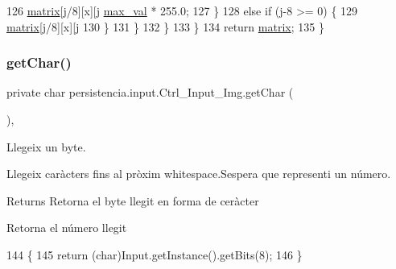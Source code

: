 \begin{DoxyCode}
126                         \hyperlink{classpersistencia_1_1input_1_1Ctrl__Input__Img_ae61f4eb4fa38ea6dfb1e03f443711948}{matrix}[j/8][x][j%
      \hyperlink{classpersistencia_1_1input_1_1Ctrl__Input__Img_a1b8fa2d000a1d5d873be62d1f609e4be}{max\_val} * 255.0;
127                     \}
128                     \textcolor{keywordflow}{else} \textcolor{keywordflow}{if} (j-8 >= 0) \{
129                         \hyperlink{classpersistencia_1_1input_1_1Ctrl__Input__Img_ae61f4eb4fa38ea6dfb1e03f443711948}{matrix}[j/8][x][j%
130                     \}
131                 \}
132             \}
133         \}
134         \textcolor{keywordflow}{return} \hyperlink{classpersistencia_1_1input_1_1Ctrl__Input__Img_ae61f4eb4fa38ea6dfb1e03f443711948}{matrix};
135     \}
\end{DoxyCode}
\mbox{\label{classpersistencia_1_1input_1_1Ctrl__Input__Img_a85a204b05c118b07d403e9b59d7f18c0}} 
\subsubsection{\texorpdfstring{get\+Char()}{getChar()}}
{\footnotesize\ttfamily private char persistencia.\+input.\+Ctrl\+\_\+\+Input\+\_\+\+Img.\+get\+Char (\begin{DoxyParamCaption}{ }\end{DoxyParamCaption})\hspace{0.3cm}{\ttfamily [inline]}, {\ttfamily [private]}}



Llegeix un byte. 

Llegeix caràcters fins al pròxim whitespace.\+S\textquotesingle{}espera que representi un número.

\begin{DoxyReturn}{Returns}
Retorna el byte llegit en forma de ceràcter

Retorna el número llegit 
\end{DoxyReturn}

\begin{DoxyCode}
144                            \{
145         \textcolor{keywordflow}{return} (\textcolor{keywordtype}{char})Input.getInstance().getBits(8);
146     \}
\end{DoxyCode}
\mbox{\label{classpersistencia_1_1input_1_1Ctrl__Input__Img_a55dc2906950235559f83b4765aea73e8}} 
